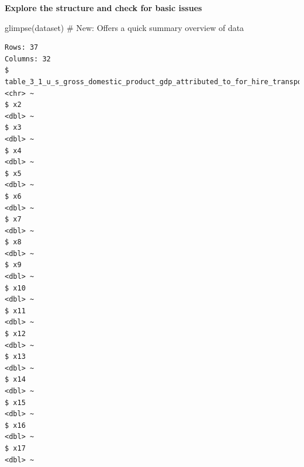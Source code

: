 \documentclass[
  letterpaper,
  DIV=11,
  numbers=noendperiod]{scrreprt}
\newenvironment{Shaded}{\begin{snugshade}}{\end{snugshade}}
\newcommand{\CommentTok}[1]{\textcolor[rgb]{0.37,0.37,0.37}{#1}}
\newcommand{\FunctionTok}[1]{\textcolor[rgb]{0.28,0.35,0.67}{#1}}
\newcommand{\NormalTok}[1]{\textcolor[rgb]{0.00,0.23,0.31}{#1}}
\begin{document}
\textbf{Explore the structure and check for basic issues}

\begin{Shaded}
\begin{Highlighting}[]
\FunctionTok{glimpse}\NormalTok{(dataset)  }\CommentTok{\# New: Offers a quick summary overview of data}
\end{Highlighting}
\end{Shaded}

\begin{verbatim}
Rows: 37
Columns: 32
$ table_3_1_u_s_gross_domestic_product_gdp_attributed_to_for_hire_transportation_services_billions_of_current_dollars <chr> ~
$ x2                                                                                                                  <dbl> ~
$ x3                                                                                                                  <dbl> ~
$ x4                                                                                                                  <dbl> ~
$ x5                                                                                                                  <dbl> ~
$ x6                                                                                                                  <dbl> ~
$ x7                                                                                                                  <dbl> ~
$ x8                                                                                                                  <dbl> ~
$ x9                                                                                                                  <dbl> ~
$ x10                                                                                                                 <dbl> ~
$ x11                                                                                                                 <dbl> ~
$ x12                                                                                                                 <dbl> ~
$ x13                                                                                                                 <dbl> ~
$ x14                                                                                                                 <dbl> ~
$ x15                                                                                                                 <dbl> ~
$ x16                                                                                                                 <dbl> ~
$ x17                                                                                                                 <dbl> ~

\end{verbatim}
\end{document}
